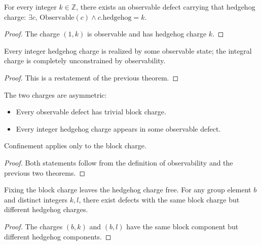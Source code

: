 \begin{theorem}
For every integer $k \in \mathbb{Z}$, there exists an observable defect carrying that hedgehog charge: $\exists c, \, \mathrm{Observable}(c) \land c.\mathrm{hedgehog} = k$.
\end{theorem}

\begin{proof}
The charge $(1, k)$ is observable and has hedgehog charge $k$.
\end{proof}

\begin{theorem}
Every integer hedgehog charge is realized by some observable state; the integral charge is completely unconstrained by observability.
\end{theorem}

\begin{proof}
This is a restatement of the previous theorem.
\end{proof}

\begin{theorem}
The two charges are asymmetric:
\begin{itemize}
\item Every observable defect has trivial block charge.
\item Every integer hedgehog charge appears in some observable defect.
\end{itemize}
Confinement applies only to the block charge.
\end{theorem}

\begin{proof}
Both statements follow from the definition of observability and the previous two theorems.
\end{proof}

\begin{theorem}
Fixing the block charge leaves the hedgehog charge free. For any group element $b$ and distinct integers $k, l$, there exist defects with the same block charge but different hedgehog charges.
\end{theorem}

\begin{proof}
The charges $(b, k)$ and $(b, l)$ have the same block component but different hedgehog components.
\end{proof}

